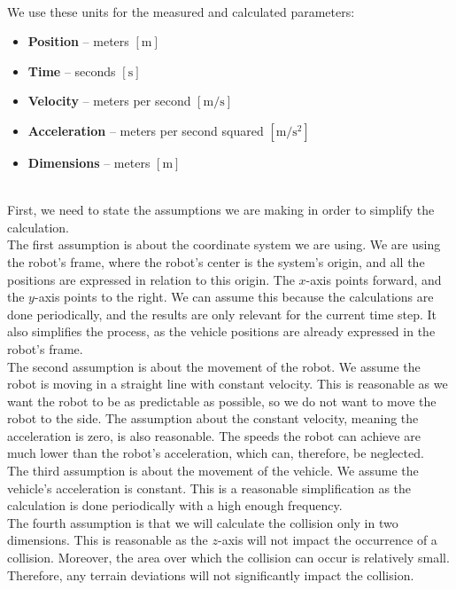     \\
        We use these units for the measured and calculated parameters:
        \begin{itemize}
            \item \textbf{Position} -- meters $[\si{\m}]$
            \item \textbf{Time} -- seconds $[\si{\s}]$
            \item \textbf{Velocity} -- meters per second $[\si{\m\per\s}]$
            \item \textbf{Acceleration} -- meters per second squared $[\si{\m\per\square\s}]$
            \item \textbf{Dimensions} -- meters $[\si{\m}]$
        \end{itemize}
    \\
        First, we need to state the assumptions we are making in order to simplify the calculation.\\
        The first assumption is about the coordinate system we are using. We are using the robot's frame, where the robot's center is the system's origin, and all the positions are expressed in relation to this origin. The $x$-axis points forward, and the $y$-axis points to the right. We can assume this because the calculations are done periodically, and the results are only relevant for the current time step. It also simplifies the process, as the vehicle positions are already expressed in the robot's frame.\\
        The second assumption is about the movement of the robot. We assume the robot is moving in a straight line with constant velocity. This is reasonable as we want the robot to be as predictable as possible, so we do not want to move the robot to the side. The assumption about the constant velocity, meaning the acceleration is zero, is also reasonable. The speeds the robot can achieve are much lower than the robot's acceleration, which can, therefore, be neglected.\\
        The third assumption is about the movement of the vehicle. We assume the vehicle's acceleration is constant. This is a reasonable simplification as the calculation is done periodically with a high enough frequency.\\
        The fourth assumption is that we will calculate the collision only in two dimensions. This is reasonable as the $z$-axis will not impact the occurrence of a collision. Moreover, the area over which the collision can occur is relatively small. Therefore, any terrain deviations will not significantly impact the collision.\\\\
